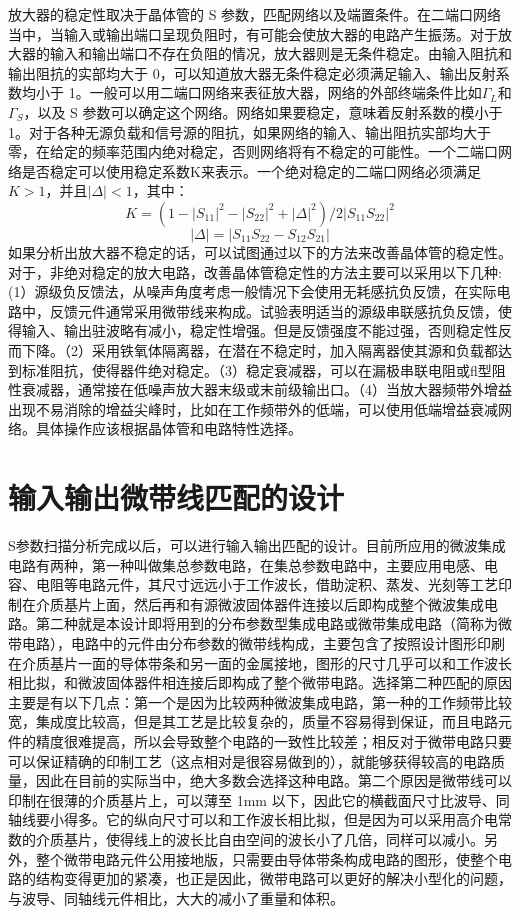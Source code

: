 放大器的稳定性取决于晶体管的 S 参数，匹配网络以及端置条件。在二端口网络当中，当输入或输出端口呈现负阻时，有可能会使放大器的电路产生振荡。对于放大器的输入和输出端口不存在负阻的情况，放大器则是无条件稳定。由输入阻抗和输出阻抗的实部均大于 0，可以知道放大器无条件稳定必须满足输入、输出反射系数均小于 1。一般可以用二端口网络来表征放大器，网络的外部终端条件比如$\Gamma_L$和$\Gamma_S$，以及 S 参数可以确定这个网络。网络如果要稳定，意味着反射系数的模小于1。对于各种无源负载和信号源的阻抗，如果网络的输入、输出阻抗实部均大于零，在给定的频率范围内绝对稳定，否则网络将有不稳定的可能性。一个二端口网络是否稳定可以使用稳定系数K来表示。一个绝对稳定的二端口网络必须满足$K> 1$，并且$|\Delta|<1$，其中：
\begin{equation}%
K=\left(
1-|S_{11}|^2-|S_{22}|^2+|\Delta|^2
\right)/2|S_{11}S_{22}|^2
\end{equation}
\begin{equation}%
|\Delta|=|S_{11}S_{22}-S_{12}S_{21}|
\end{equation}
如果分析出放大器不稳定的话，可以试图通过以下的方法来改善晶体管的稳定性。对于，非绝对稳定的放大电路，改善晶体管稳定性的方法主要可以采用以下几种:(1）源级负反馈法，从噪声角度考虑一般情况下会使用无耗感抗负反馈，在实际电路中，反馈元件通常采用微带线来构成。试验表明适当的源级串联感抗负反馈，使得输入、输出驻波略有减小，稳定性增强。但是反馈强度不能过强，否则稳定性反而下降。（2）采用铁氧体隔离器，在潜在不稳定时，加入隔离器使其源和负载都达到标准阻抗，使得器件绝对稳定。（3）稳定衰减器，可以在漏极串联电阻或fl型阻性衰减器，通常接在低噪声放大器末级或末前级输出口。（4）当放大器频带外增益出现不易消除的增益尖峰时，比如在工作频带外的低端，可以使用低端增益衰减网络。具体操作应该根据晶体管和电路特性选择。

\section{输入输出微带线匹配的设计}
S参数扫描分析完成以后，可以进行输入输出匹配的设计。目前所应用的微波集成电路有两种，第一种叫做集总参数电路，在集总参数电路中，主要应用电感、电容、电阻等电路元件，其尺寸远远小于工作波长，借助淀积、蒸发、光刻等工艺印制在介质基片上面，然后再和有源微波固体器件连接以后即构成整个微波集成电路。第二种就是本设计即将用到的分布参数型集成电路或微带集成电路（简称为微带电路），电路中的元件由分布参数的微带线构成，主要包含了按照设计图形印刷在介质基片一面的导体带条和另一面的金属接地，图形的尺寸几乎可以和工作波长相比拟，和微波固体器件相连接后即构成了整个微带电路。选择第二种匹配的原因主要是有以下几点：第一个是因为比较两种微波集成电路，第一种的工作频带比较宽，集成度比较高，但是其工艺是比较复杂的，质量不容易得到保证，而且电路元件的精度很难提高，所以会导致整个电路的一致性比较差；相反对于微带电路只要可以保证精确的印制工艺（这点相对是很容易做到的），就能够获得较高的电路质量，因此在目前的实际当中，绝大多数会选择这种电路。第二个原因是微带线可以印制在很薄的介质基片上，可以薄至 1mm 以下，因此它的横截面尺寸比波导、同轴线要小得多。它的纵向尺寸可以和工作波长相比拟，但是因为可以采用高介电常数的介质基片，使得线上的波长比自由空间的波长小了几倍，同样可以减小。另外，整个微带电路元件公用接地版，只需要由导体带条构成电路的图形，使整个电路的结构变得更加的紧凑，也正是因此，微带电路可以更好的解决小型化的问题，与波导、同轴线元件相比，大大的减小了重量和体积。

